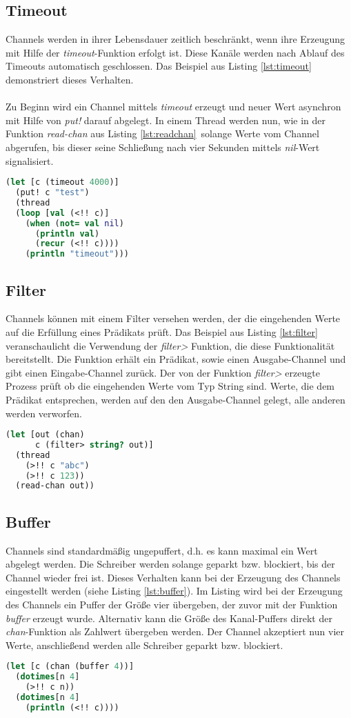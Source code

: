 \subsection{Timeout}
Channels werden in ihrer Lebensdauer zeitlich beschränkt, wenn ihre Erzeugung mit Hilfe der \textit{timeout}-Funktion erfolgt ist. Diese Kanäle werden nach Ablauf des Timeouts automatisch geschlossen. Das Beispiel aus Listing \ref{lst:timeout} demonstriert dieses Verhalten.\\
\\
Zu Beginn wird ein Channel mittels \textit{timeout} erzeugt und neuer Wert asynchron mit Hilfe von \textit{put!} darauf abgelegt. In einem Thread werden nun, wie in der Funktion \textit{read-chan} aus Listing \ref{lst:readchan}\ solange Werte vom Channel abgerufen, bis dieser seine Schließung nach vier Sekunden mittels \textit{nil}-Wert signalisiert.
\begin{lstlisting}[language=Clojure,caption=Timeout,label=lst:timeout]
(let [c (timeout 4000)]
  (put! c "test")
  (thread
  (loop [val (<!! c)]
    (when (not= val nil)
      (println val)
      (recur (<!! c))))
    (println "timeout")))
\end{lstlisting}
\subsection{Filter}
Channels können mit einem Filter versehen werden, der die eingehenden Werte auf die Erfüllung eines Prädikats prüft. Das Beispiel aus Listing \ref{lst:filter} veranschaulicht die Verwendung der \textit{filter>} Funktion, die diese Funktionalität bereitstellt. Die Funktion erhält ein Prädikat, sowie einen Ausgabe-Channel und gibt einen Eingabe-Channel zurück. Der von der Funktion \textit{filter>} erzeugte Prozess prüft ob die eingehenden Werte vom Typ String sind. Werte, die dem Prädikat entsprechen, werden auf den den Ausgabe-Channel gelegt, alle anderen werden verworfen.
\begin{lstlisting}[language=Clojure,caption=Filter,label=lst:filter]
(let [out (chan)
      c (filter> string? out)]
  (thread
    (>!! c "abc")
    (>!! c 123))
  (read-chan out))
\end{lstlisting}
\subsection{Buffer}
Channels sind standardmäßig ungepuffert, d.h. es kann maximal ein Wert abgelegt werden. Die Schreiber werden solange geparkt bzw. blockiert, bis der Channel wieder frei ist. Dieses Verhalten kann bei der Erzeugung des Channels eingestellt werden (siehe Listing \ref{lst:buffer}). Im Listing wird bei der Erzeugung des Channels ein Puffer der Größe vier übergeben, der zuvor mit der Funktion \textit{buffer} erzeugt wurde. Alternativ kann die Größe des Kanal-Puffers direkt der \textit{chan}-Funktion als Zahlwert übergeben werden. Der Channel akzeptiert nun vier Werte, anschließend werden alle Schreiber geparkt bzw. blockiert.
\begin{lstlisting}[language=Clojure,caption=Buffer,label=lst:buffer]
(let [c (chan (buffer 4))]
  (dotimes[n 4]
    (>!! c n))
  (dotimes[n 4]
    (println (<!! c))))
\end{lstlisting}
\acresetall
